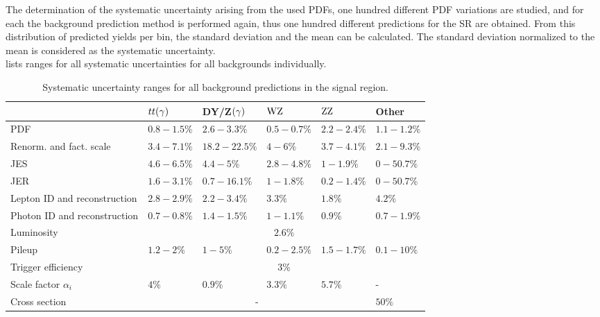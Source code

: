 The determination of the systematic uncertainty arising from the used PDFs, one hundred different PDF variations are studied, and for each the background prediction method is performed again, thus one hundred different predictions for the SR are obtained. From this distribution of predicted yields per bin, the standard deviation and the mean can be calculated. The standard deviation normalized to the mean is considered as the systematic uncertainty.\\
 lists ranges for all systematic uncertainties for all backgrounds individually.
\begin{table}[tbp]
 \centering
 \caption{Systematic uncertainty ranges for all background predictions in the signal region.}
 \small
 \label{tab:systuncBKG}
 \begin{tabular}[width=\textwidth]{llllll}
                               & $tt(\gamma)$                  & DY/Z$(\gamma)$  & $\mathrm{W}\mathrm{Z}$    & $\mathrm{Z}\mathrm{Z}$    & Other       \\\hline
  PDF                          & $0.8-1.5\%$                 & $2.6-3.3\%$   & $0.5-0.7\%$ & $2.2-2.4\%$ & $1.1-1.2\%$ \\
  Renorm. and fact. scale      & $3.4-7.1\%$                 & $18.2-22.5\%$ & $4-6\%$     & $3.7-4.1\%$ & $2.1-9.3\%$ \\
  JES                          & $4.6-6.5\%$                 & $4.4-5\%$     & $2.8-4.8\%$ & $1-1.9\%$   & $0-50.7\%$  \\
  JER                          & $1.6-3.1\%$                 & $0.7-16.1\%$  & $1-1.8\%$   & $0.2-1.4\%$ & $0-50.7\%$  \\
  Lepton ID and reconstruction & $2.8-2.9\%$                 & $2.2-3.4\%$   & $3.3\%$     & $1.8\%$     & $4.2\%$     \\
  Photon ID and reconstruction & $0.7-0.8\%$                 & $1.4-1.5\%$   & $1-1.1\%$   & $0.9\%$     & $0.7-1.9\%$ \\
  Luminosity                   & \multicolumn{5}{c}{$2.6\%$}                                                           \\
  Pileup                       & $1.2-2\%$                   & $1-5\%$       & $0.2-2.5\%$ & $1.5-1.7\%$ & $0.1-10\%$  \\
  Trigger efficiency           & \multicolumn{5}{c}{$3\%$}                                                             \\
  Scale factor $\alpha_{i}$    & $4\%$                       & $0.9\%$       & $3.3\%$     & $5.7\%$     & -           \\
  Cross section                & \multicolumn{4}{c}{-}       & $50\%$                                                  \\
  \hline
 \end{tabular}
\end{table}
